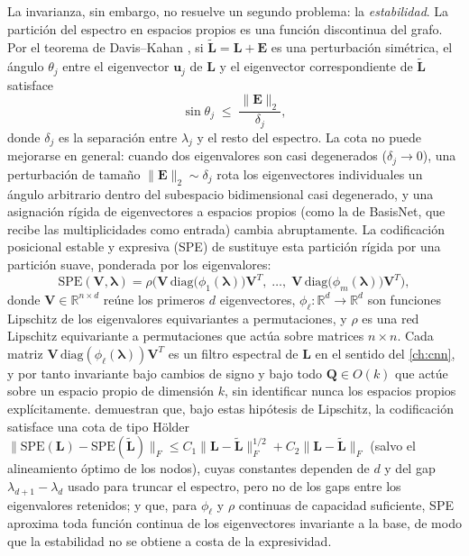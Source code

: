 La invarianza, sin embargo, no resuelve un segundo problema: la \emph{estabilidad}. La partición del espectro en espacios propios es una función discontinua del grafo. Por el teorema de Davis--Kahan \citep{davis1970rotation}, si $\tilde{\mathbf{L}} = \mathbf{L} + \mathbf{E}$ es una perturbación simétrica, el ángulo $\theta_j$ entre el eigenvector $\mathbf{u}_j$ de $\mathbf{L}$ y el eigenvector correspondiente de $\tilde{\mathbf{L}}$ satisface
\begin{equation}
    \sin \theta_j \;\leq\; \frac{\|\mathbf{E}\|_2}{\delta_j},
    \label{eq:davis_kahan}
\end{equation}
donde $\delta_j$ es la separación entre $\lambda_j$ y el resto del espectro. La cota no puede mejorarse en general: cuando dos eigenvalores son casi degenerados ($\delta_j \to 0$), una perturbación de tamaño $\|\mathbf{E}\|_2 \sim \delta_j$ rota los eigenvectores individuales un ángulo arbitrario dentro del subespacio bidimensional casi degenerado, y una asignación rígida de eigenvectores a espacios propios (como la de BasisNet, que recibe las multiplicidades como entrada) cambia abruptamente. La codificación posicional estable y expresiva (SPE) de \citet{huang2024spe} sustituye esta partición rígida por una partición suave, ponderada por los eigenvalores:
\begin{equation}
    \text{SPE}(\mathbf{V}, \boldsymbol{\lambda}) = \rho\Big( \mathbf{V}\,\text{diag}\big(\phi_1(\boldsymbol{\lambda})\big)\mathbf{V}^T, \; \ldots, \; \mathbf{V}\,\text{diag}\big(\phi_m(\boldsymbol{\lambda})\big)\mathbf{V}^T \Big),
    \label{eq:spe}
\end{equation}
donde $\mathbf{V} \in \mathbb{R}^{n \times d}$ reúne los primeros $d$ eigenvectores, $\phi_\ell: \mathbb{R}^d \to \mathbb{R}^d$ son funciones Lipschitz de los eigenvalores equivariantes a permutaciones, y $\rho$ es una red Lipschitz equivariante a permutaciones que actúa sobre matrices $n \times n$. Cada matriz $\mathbf{V}\,\text{diag}(\phi_\ell(\boldsymbol{\lambda}))\mathbf{V}^T$ es un filtro espectral de $\mathbf{L}$ en el sentido del \autoref{ch:cnn}, y por tanto invariante bajo cambios de signo y bajo todo $\mathbf{Q} \in O(k)$ que actúe sobre un espacio propio de dimensión $k$, sin identificar nunca los espacios propios explícitamente. \citet{huang2024spe} demuestran que, bajo estas hipótesis de Lipschitz, la codificación satisface una cota de tipo Hölder $\|\text{SPE}(\mathbf{L}) - \text{SPE}(\tilde{\mathbf{L}})\|_F \leq C_1 \|\mathbf{L} - \tilde{\mathbf{L}}\|_F^{1/2} + C_2 \|\mathbf{L} - \tilde{\mathbf{L}}\|_F$ (salvo el alineamiento óptimo de los nodos), cuyas constantes dependen de $d$ y del gap $\lambda_{d+1} - \lambda_d$ usado para truncar el espectro, pero no de los gaps entre los eigenvalores retenidos; y que, para $\phi_\ell$ y $\rho$ continuas de capacidad suficiente, SPE aproxima toda función continua de los eigenvectores invariante a la base, de modo que la estabilidad no se obtiene a costa de la expresividad.

